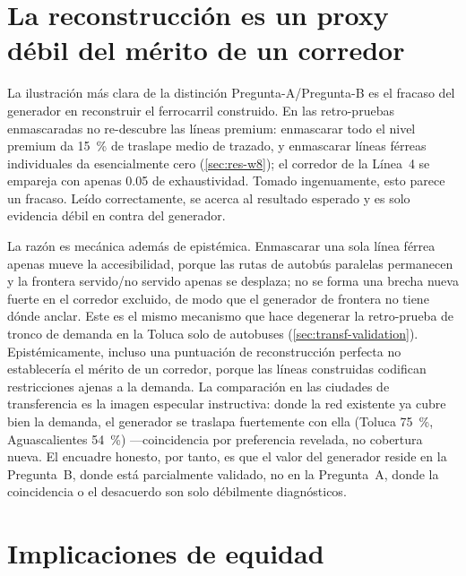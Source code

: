 \section{La reconstrucción es un proxy débil del mérito de un corredor}
\label{sec:disc-reconstruction}

La ilustración más clara de la distinción Pregunta-A/Pregunta-B es el fracaso del
generador en reconstruir el ferrocarril construido. En las retro-pruebas enmascaradas
no re-descubre las líneas premium: enmascarar todo el nivel premium da
\SI{15}{\percent} de traslape medio de trazado, y enmascarar líneas férreas
individuales da esencialmente cero (\cref{sec:res-w8}); el corredor de la Línea~4 se
empareja con apenas \num{0.05} de exhaustividad. Tomado ingenuamente, esto parece un
fracaso. Leído correctamente, se acerca al resultado esperado y es solo evidencia débil
en contra del generador.

La razón es mecánica además de epistémica. Enmascarar una sola línea férrea apenas
mueve la accesibilidad, porque las rutas de autobús paralelas permanecen y la frontera
servido/no servido apenas se desplaza; no se forma una brecha nueva fuerte en el
corredor excluido, de modo que el generador de frontera no tiene dónde anclar. Este es
el mismo mecanismo que hace degenerar la retro-prueba de tronco de demanda en la Toluca
solo de autobuses (\cref{sec:transf-validation}). Epistémicamente, incluso una
puntuación de reconstrucción perfecta no establecería el mérito de un corredor, porque
las líneas construidas codifican restricciones ajenas a la demanda. La comparación en
las ciudades de transferencia es la imagen especular instructiva: donde la red
existente ya cubre bien la demanda, el generador se traslapa fuertemente con ella
(Toluca \SI{75}{\percent}, Aguascalientes \SI{54}{\percent}) ---coincidencia por
preferencia revelada, no cobertura nueva. El encuadre honesto, por tanto, es que el
valor del generador reside en la Pregunta~B, donde está parcialmente validado, no en la
Pregunta~A, donde la coincidencia o el desacuerdo son solo débilmente diagnósticos.

\section{Implicaciones de equidad}
\label{sec:disc-equity}

